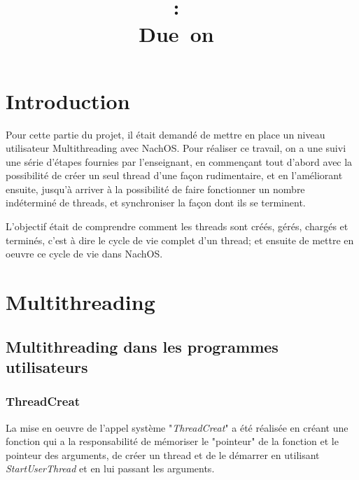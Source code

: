 \documentclass{article}
\title{\vspace{2in}
\textmd{\textbf{\hmwkClass:\ \hmwkTitle}}\\
\normalsize\vspace{0.1in}\small{Due\ on\ \hmwkDueDate}\\
\vspace{0.1in}\large{\textit{\hmwkClassInstructor}}
\vspace{3in}
}
\author{\textbf{\hmwkAuthorName}}
\date{} %
\begin{document}
\maketitle



\newpage
\tableofcontents
\newpage



\section{Introduction}
Pour cette partie du projet, il était demandé de mettre en place un niveau utilisateur Multithreading avec NachOS.
\newline
Pour réaliser ce travail, on a une suivi une série d'étapes fournies par l'enseignant, en commençant tout d'abord avec la possibilité de créer un seul thread d'une façon rudimentaire, et en l'améliorant ensuite, jusqu'à arriver à la possibilité de faire fonctionner un nombre indéterminé de threads, et synchroniser la façon dont ils se terminent.

L'objectif était de comprendre comment les threads sont créés, gérés, chargés et terminés, c'est à dire le cycle de vie complet d'un thread; et ensuite de mettre en oeuvre ce cycle de vie dans NachOS.

\section{Multithreading}
\subsection{Multithreading dans les programmes utilisateurs}

\subsubsection{ThreadCreat}
La mise en oeuvre de l'appel système "\textit{ThreadCreat}" a été réalisée en créant une fonction qui a la responsabilité de mémoriser le "pointeur" de la fonction et le pointeur des arguments, de créer un thread et de le démarrer en utilisant \textit{StartUserThread} et en lui passant les arguments. 
\end{document}
